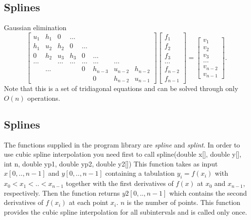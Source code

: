 \documentclass[%
twoside,                 %
final,                   %
10pt]{article}
\begin{document}
{{{{{{{\subsection{Splines}
\begin{block}{}
Gaussian elimination
\[
   \left[\begin{array}{cccccccc} u_1 & h_1 &0 &\dots & & & & \\
                                 h_1 & u_2 & h_2 &0 &\dots & & & \\
                                  0   & h_2 & u_3 & h_3 &0 &\dots & & \\
                               \dots& & \dots &\dots &\dots &\dots &\dots & \\
                                 &\dots & & &0 &h_{n-3} &u_{n-2} &h_{n-2} \\
                                 & && & &0 &h_{n-2} &u_{n-1} \end{array}\right]
   \left[\begin{array}{c} f_1 \\ 
                          f_2 \\
                          f_3\\
                          \dots \\
                          f_{n-2} \\ 
                          f_{n-1} \end{array} \right] =
   \left[\begin{array}{c} v_1 \\ 
                          v_2 \\
                          v_3\\
                          \dots \\
                          v_{n-2}\\
                          v_{n-1} \end{array} \right].
\]
Note that this is a set of tridiagonal equations and can be solved 
through only $O(n)$ operations.
\end{block}

\subsection{Splines}
\begin{block}{}
The functions supplied in the program library are \emph{spline} and \emph{splint}.
In order to use cubic spline interpolation you need first to call  
\bcppcod
spline(double x[], double y[], int n, double yp1,  double yp2, double y2[])
\ecppcod
This function takes as
input $x[0,..,n - 1]$ and $y[0,..,n - 1]$ containing a tabulation
$y_i = f(x_i)$ with $x_0 < x_1 < .. < x_{n - 1}$ 
together with the 
first derivatives  of $f(x)$ at $x_0$ and $x_{n-1}$, respectively. Then the
function returns $y2[0,..,n-1]$ which contains the second derivatives of
$f(x_i)$ at each point $x_i$. $n$ is the number of points.
This function provides the cubic spline interpolation for all subintervals
and is called only once.
\end{block}


}}}}}}}
\end{document}
